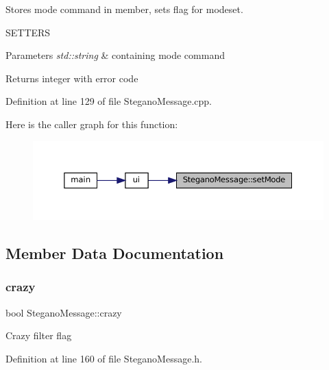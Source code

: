 Stores mode command in member, sets flag for modeset. 

S\+E\+T\+T\+E\+RS
\begin{DoxyParams}{Parameters}
{\em std\+::string} & containing mode command \\
\hline
\end{DoxyParams}
\begin{DoxyReturn}{Returns}
integer with error code 
\end{DoxyReturn}


Definition at line 129 of file Stegano\+Message.\+cpp.

Here is the caller graph for this function\+:\nopagebreak
\begin{figure}[H]
\begin{center}
\leavevmode
\includegraphics[width=350pt]{classSteganoMessage_a3e06a73baa5744b5eb9152f4ae65f458_icgraph}
\end{center}
\end{figure}


\subsection{Member Data Documentation}
\mbox{\label{classSteganoMessage_aa66c9e1d0367981d42ede819e1a51131}} 
\subsubsection{\texorpdfstring{crazy}{crazy}}
{\footnotesize\ttfamily bool Stegano\+Message\+::crazy\hspace{0.3cm}{\ttfamily [private]}}

Crazy filter flag 

Definition at line 160 of file Stegano\+Message.\+h.

\mbox{\label{classSteganoMessage_a26b631e00716be7a89cbcf22cf0b7291}} 

